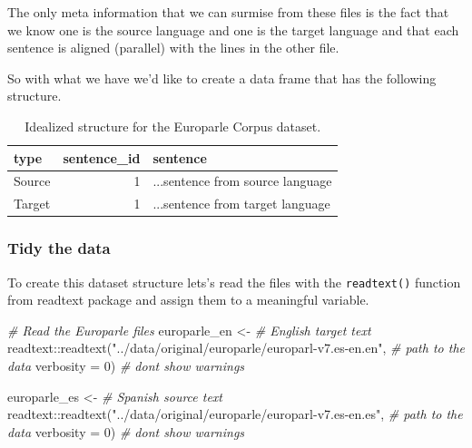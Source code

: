 \documentclass[
]{article}
\newenvironment{Shaded}{\begin{snugshade}}{\end{snugshade}}
\newcommand{\AttributeTok}[1]{\textcolor[rgb]{0.77,0.63,0.00}{#1}}
\newcommand{\CommentTok}[1]{\textcolor[rgb]{0.56,0.35,0.01}{\textit{#1}}}
\newcommand{\DecValTok}[1]{\textcolor[rgb]{0.00,0.00,0.81}{#1}}
\newcommand{\FunctionTok}[1]{\textcolor[rgb]{0.00,0.00,0.00}{#1}}
\newcommand{\NormalTok}[1]{#1}
\newcommand{\OtherTok}[1]{\textcolor[rgb]{0.56,0.35,0.01}{#1}}
\newcommand{\SpecialCharTok}[1]{\textcolor[rgb]{0.00,0.00,0.00}{#1}}
\newcommand{\StringTok}[1]{\textcolor[rgb]{0.31,0.60,0.02}{#1}}
\begin{document}
The only meta information that we can surmise from these files is the fact that we know one is the source language and one is the target language and that each sentence is aligned (parallel) with the lines in the other file.

So with what we have we'd like to create a data frame that has the following structure.

\begin{table}

\caption{\label{tab:cd-unstructured-europarle-structure-example}Idealized structure for the Europarle Corpus dataset.}
\centering
\begin{tabular}[t]{lrl}
\toprule
type & sentence\_id & sentence\\
\midrule
Source & 1 & ...sentence from source language\\
Target & 1 & ...sentence from target language\\
\bottomrule
\end{tabular}
\end{table}

\hypertarget{tidy-the-data}{%
\subsubsection{Tidy the data}\label{tidy-the-data}}

To create this dataset structure lets's read the files with the \texttt{readtext()} function from readtext package and assign them to a meaningful variable.

\begin{Shaded}
\begin{Highlighting}[]
\CommentTok{\# Read the Europarle files}
\NormalTok{europarle\_en }\OtherTok{\textless{}{-}}  \CommentTok{\# English target text}
\NormalTok{  readtext}\SpecialCharTok{::}\FunctionTok{readtext}\NormalTok{(}\StringTok{"../data/original/europarle/europarl{-}v7.es{-}en.en"}\NormalTok{, }\CommentTok{\# path to the data}
                     \AttributeTok{verbosity =} \DecValTok{0}\NormalTok{) }\CommentTok{\# don\textquotesingle{}t show warnings}

\NormalTok{europarle\_es }\OtherTok{\textless{}{-}} \CommentTok{\# Spanish source text}
\NormalTok{  readtext}\SpecialCharTok{::}\FunctionTok{readtext}\NormalTok{(}\StringTok{"../data/original/europarle/europarl{-}v7.es{-}en.es"}\NormalTok{, }\CommentTok{\# path to the data}
                     \AttributeTok{verbosity =} \DecValTok{0}\NormalTok{) }\CommentTok{\# don\textquotesingle{}t show warnings}
\end{Highlighting}
\end{Shaded}
\end{document}
